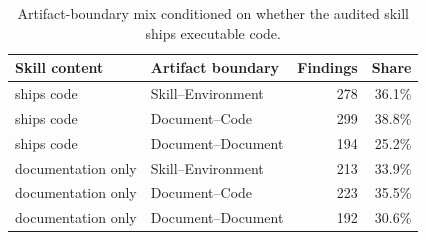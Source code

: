 \begin{table}[t]
  \centering
  \caption{Artifact-boundary mix conditioned on whether the audited skill ships executable code.}
  \label{tab:rq1-boundary-code}
  \small
  \setlength{\tabcolsep}{4pt}

  \begin{tabular}{llrr}
    \toprule
    Skill content & Artifact boundary & Findings & Share \\
    \midrule
    ships code & Skill–Environment & 278 & 36.1\% \\
    ships code & Document–Code & 299 & 38.8\% \\
    ships code & Document–Document & 194 & 25.2\% \\
    documentation only & Skill–Environment & 213 & 33.9\% \\
    documentation only & Document–Code & 223 & 35.5\% \\
    documentation only & Document–Document & 192 & 30.6\% \\
    \bottomrule
  \end{tabular}
\end{table}

